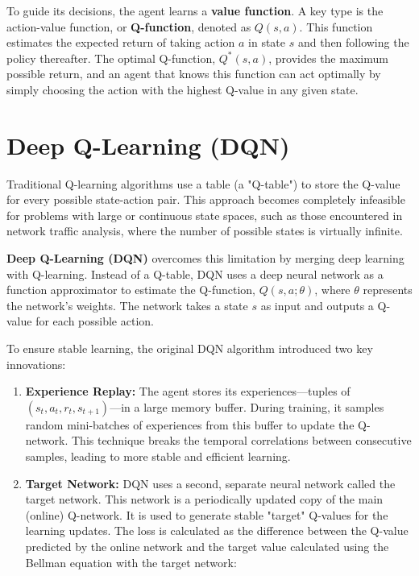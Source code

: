 \documentclass{report}
\begin{document}
To guide its decisions, the agent learns a \textbf{value function}. A key type is the action-value function, or \textbf{Q-function}, denoted as $Q(s, a)$. This function estimates the expected return of taking action $a$ in state $s$ and then following the policy thereafter. The optimal Q-function, $Q^*(s, a)$, provides the maximum possible return, and an agent that knows this function can act optimally by simply choosing the action with the highest Q-value in any given state.

\section{Deep Q-Learning (DQN)}
Traditional Q-learning algorithms use a table (a "Q-table") to store the Q-value for every possible state-action pair. This approach becomes completely infeasible for problems with large or continuous state spaces, such as those encountered in network traffic analysis, where the number of possible states is virtually infinite.

\textbf{Deep Q-Learning (DQN)} overcomes this limitation by merging deep learning with Q-learning. Instead of a Q-table, DQN uses a deep neural network as a function approximator to estimate the Q-function, $Q(s, a; \theta)$, where $\theta$ represents the network's weights. The network takes a state $s$ as input and outputs a Q-value for each possible action.

To ensure stable learning, the original DQN algorithm introduced two key innovations:
\begin{enumerate}
    \item \textbf{Experience Replay:} The agent stores its experiences—tuples of $(s_t, a_t, r_t, s_{t+1})$—in a large memory buffer. During training, it samples random mini-batches of experiences from this buffer to update the Q-network. This technique breaks the temporal correlations between consecutive samples, leading to more stable and efficient learning.
    \item \textbf{Target Network:} DQN uses a second, separate neural network called the target network. This network is a periodically updated copy of the main (online) Q-network. It is used to generate stable "target" Q-values for the learning updates. The loss is calculated as the difference between the Q-value predicted by the online network and the target value calculated using the Bellman equation with the target network:
\end{enumerate}
\end{document}
